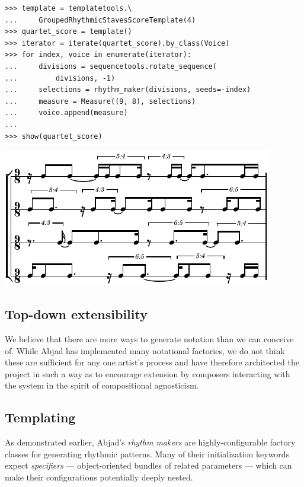 \documentclass{article}
\begin{document}
\begin{lstlisting}
>>> template = templatetools.\
...     GroupedRhythmicStavesScoreTemplate(4)
>>> quartet_score = template()
>>> iterator = iterate(quartet_score).by_class(Voice)
>>> for index, voice in enumerate(iterator):
...     divisions = sequencetools.rotate_sequence(
...         divisions, -1)
...     selections = rhythm_maker(divisions, seeds=-index)
...     measure = Measure((9, 8), selections)
...     voice.append(measure)
...
>>> show(quartet_score)
\end{lstlisting}
\includegraphics{assets/lilypond-07f633b33deadb5b938f688d727585f0.pdf}

\subsection{Top-down extensibility}

We believe that there are more ways to generate notation than we can conceive
of. While Abjad has implemented many notational factories, we do not think
these are sufficient for any one artist's process and have therefore
architected the project in such a way as to encourage extension by composers
interacting with the system in the spirit of compositional agnosticism.

\subsection{Templating}

As demonstrated earlier, Abjad's \emph{rhythm makers} are highly-configurable
factory classes for generating rhythmic patterns. Many of their initialization
keywords expect \emph{specifiers} --- object-oriented bundles of related
parameters --- which can make their configurations potentially deeply nested.

\end{document}
